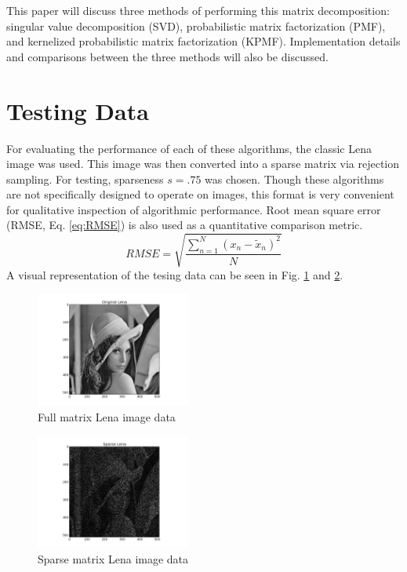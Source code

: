 \documentclass[journal]{IEEEtran}
\begin{document}
This paper will discuss three methods of performing this matrix decomposition: singular value decomposition (SVD), 
probabilistic matrix factorization (PMF), and kernelized probabilistic matrix factorization (KPMF). Implementation details and comparisons between
the three methods will also be discussed.

\section{Testing Data}
For evaluating the performance of each of these algorithms, the classic Lena image was used. This image was then converted into a sparse matrix via 
rejection sampling. For testing, sparseness \begin{math}s = .75\end{math} was chosen. Though these algorithms are not specifically designed to operate on 
images, this format is very convenient for qualitative inspection of algorithmic performance. Root mean square error (RMSE, Eq. \ref{eq:RMSE}) 
is also used as a quantitative comparison metric.
\begin{equation}
    RMSE=\sqrt{\frac{\sum\limits^N_{n=1}(x_n-\tilde{x}_{n})^2}{N}}
\label{eq:RMSE}
\end{equation}
A visual representation of the tesing data can be seen in Fig. \ref{fig:lena} and \ref{fig:sparselena}.
\begin{figure}[h!]
\centering
    \includegraphics[width=0.45\textwidth]{lena.png}
    \caption{Full matrix Lena image data}
    \label{fig:lena}
\end{figure}
\begin{figure}[h!]
\centering
    \includegraphics[width=0.45\textwidth]{sparselena.png}
    \caption{Sparse matrix Lena image data}
    \label{fig:sparselena}
\end{figure}
\end{document}
